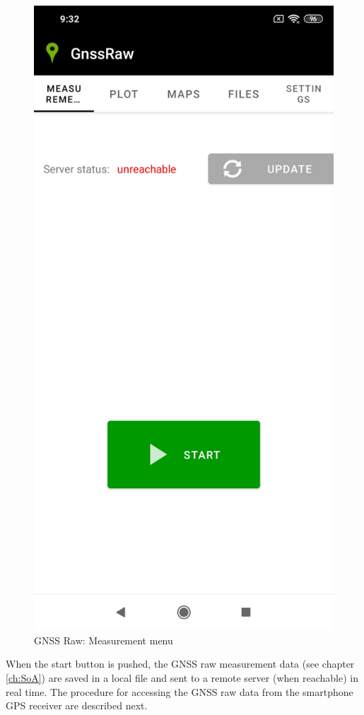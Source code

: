 \begin{figure}[H] 
	\centering
	\includegraphics[scale=0.15,frame]{fig/gnssraw_measurement.jpg} 
	\caption{GNSS Raw: Measurement menu}
	\label{FIG:gnssraw_measurement} 
\end{figure}
When the start button is pushed, the GNSS raw measurement data (see chapter \ref{ch:SoA}) are saved in a local file and sent to a remote server (when reachable) in real time. 
The procedure for accessing the GNSS raw data from the smartphone GPS receiver are described next.
